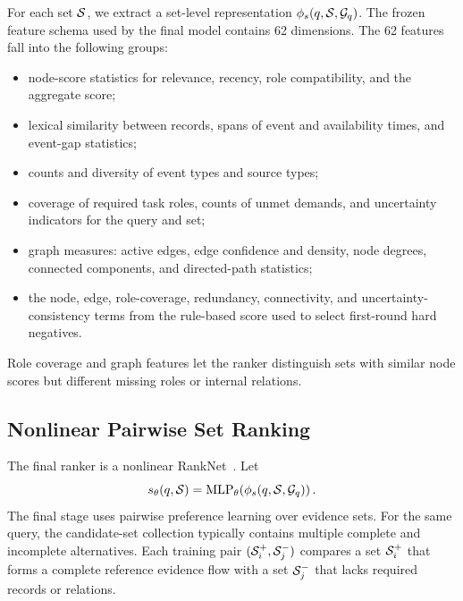 For each set $\mathcal{S}$, we extract a set-level representation $\phi_s(q,\mathcal{S},\mathcal{G}_q)$. The frozen feature schema used by the final model contains 62 dimensions.
The 62 features fall into the following groups:
\begin{itemize}
    \item node-score statistics for relevance, recency, role compatibility, and the aggregate score;
    \item lexical similarity between records, spans of event and availability times, and event-gap statistics;
    \item counts and diversity of event types and source types;
    \item coverage of required task roles, counts of unmet demands, and uncertainty indicators for the query and set;
    \item graph measures: active edges, edge confidence and density, node degrees, connected components, and directed-path statistics;
    \item the node, edge, role-coverage, redundancy, connectivity, and uncertainty-consistency terms from the rule-based score used to select first-round hard negatives.
\end{itemize}
Role coverage and graph features let the ranker distinguish sets with similar node scores but different missing roles or internal relations.

\subsection{Nonlinear Pairwise Set Ranking}

The final ranker is a nonlinear RankNet~\cite{burges2005ranknet}. Let
\begin{equation}
s_{\theta}(q,\mathcal{S})
=
\operatorname{MLP}_{\theta}
\!\left(
\phi_s(q,\mathcal{S},\mathcal{G}_q)
\right).
\end{equation}
The final stage uses pairwise preference learning over evidence sets. For the same query, the candidate-set collection typically contains multiple complete and incomplete alternatives. Each training pair
$(\mathcal{S}_i^+,\mathcal{S}_j^-)$
compares a set $\mathcal{S}_i^+$ that forms a complete reference evidence flow with a set $\mathcal{S}_j^-$ that lacks required records or relations.

